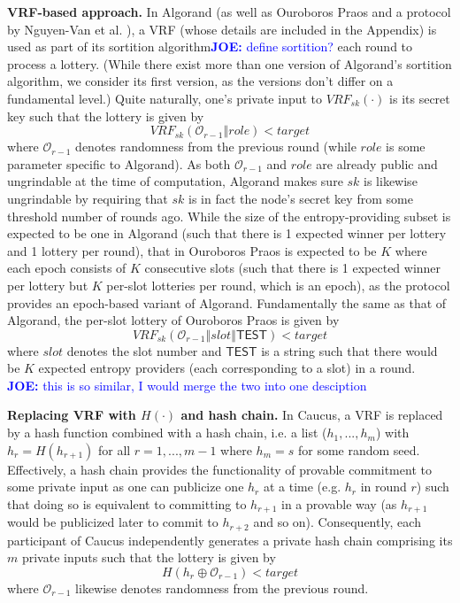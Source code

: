 \documentclass[letterpaper,twocolumn,10pt]{article}
\theoremstyle{definition}
\theoremstyle{remark}
\newcommand{\joenote}[1]{\textcolor{blue}{\textbf{JOE:} #1}}
\begin{document}
\noindent\textbf{VRF-based approach.} In Algorand \cite{gilad2017algorand} (as well as Ouroboros Praos \cite{david2018ouroboros} and a protocol by Nguyen-Van et al. \cite{nguyen2019scalable}), a VRF (whose details are included in the Appendix) is used as part of its sortition algorithm\joenote{define sortition?} each round to process a lottery. (While there exist more than one version of Algorand's sortition algorithm, we consider its first version, as the versions don't differ on a fundamental level.) Quite naturally, one's private input to $VRF_{sk}(\cdot)$ is its secret key such that the lottery is given by
\[
VRF_{sk}(\mathcal{O}_{r - 1} \mathbin\Vert role) < target
\]
where $\mathcal{O}_{r - 1}$ denotes randomness from the previous round (while $role$ is some parameter specific to Algorand). As both $\mathcal{O}_{r - 1}$ and $role$ are already public and ungrindable at the time of computation, Algorand makes sure $sk$ is likewise ungrindable by requiring that $sk$ is in fact the node's secret key from some threshold number of rounds ago. While the size of the entropy-providing subset is expected to be one in Algorand (such that there is 1 expected winner per lottery and 1 lottery per round), that in Ouroboros Praos is expected to be $K$ where each epoch consists of $K$ consecutive slots (such that there is 1 expected winner per lottery but $K$ per-slot lotteries per round, which is an epoch), as the protocol provides an epoch-based variant of Algorand. Fundamentally the same as that of Algorand, the per-slot lottery of Ouroboros Praos is given by
\[
VRF_{sk}(\mathcal{O}_{r - 1} \mathbin\Vert slot \mathbin\Vert \mathsf{TEST}) < target
\]
where $slot$ denotes the slot number and $\mathsf{TEST}$ is a string such that there would be $K$ expected entropy providers (each corresponding to a slot) in a round.\\\joenote{this is so similar, I would merge the two into one desciption}

\noindent\textbf{Replacing VRF with $H(\cdot)$ and hash chain.} In Caucus, a VRF is replaced by a hash function combined with a hash chain, i.e. a list ($h_1, ..., h_m$) with $h_r = H(h_{r + 1})$ for all $r = 1, ..., m - 1$ where $h_m = s$ for some random seed. Effectively, a hash chain provides the functionality of provable commitment to some private input as one can publicize one $h_r$ at a time (e.g. $h_r$ in round $r$) such that doing so is equivalent to committing to $h_{r + 1}$ in a provable way (as $h_{r + 1}$ would be publicized later to commit to $h_{r + 2}$ and so on). Consequently, each participant of Caucus independently generates a private hash chain comprising its $m$ private inputs such that the lottery is given by
\[
H(h_r \oplus \mathcal{O}_{r - 1}) < target
\]
where $\mathcal{O}_{r - 1}$ likewise denotes randomness from the previous round.
\end{document}
